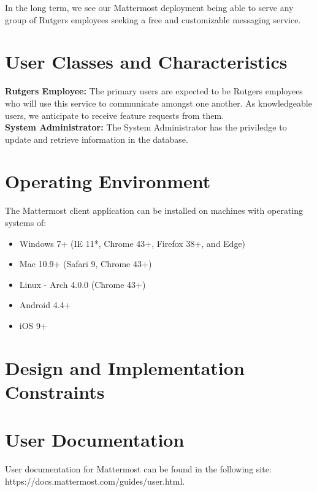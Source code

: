 \documentclass{scrreprt}
\newcommand\tab[1][0.5cm]{\hspace*{#1}}
\begin{document}
In the long term, we see our Mattermost deployment being able to serve any group
of Rutgers employees seeking a free and customizable messaging service.

\section{User Classes and Characteristics}
\textbf{Rutgers Employee:}
\tab The primary users are expected to be Rutgers employees who will use this
service to communicate amongst one another.  As knowledgeable users, we
anticipate to receive feature requests from them.\\

\noindent
\textbf{System Administrator:}
\tab The System Administrator has the priviledge to update and retrieve
information in the database.

\section{Operating Environment}
The Mattermost client application can be installed on machines with operating
systems of:
\begin{itemize}
\item Windows 7+ (IE 11*, Chrome 43+, Firefox 38+, and Edge)
\item Mac 10.9+ (Safari 9, Chrome 43+)
\item Linux - Arch 4.0.0 (Chrome 43+)
\item Android 4.4+
\item iOS 9+
\end{itemize}

\section{Design and Implementation Constraints}

\section{User Documentation}
User documentation for Mattermost can be found in the following site:\\
https://docs.mattermost.com/guides/user.html.
\end{document}
